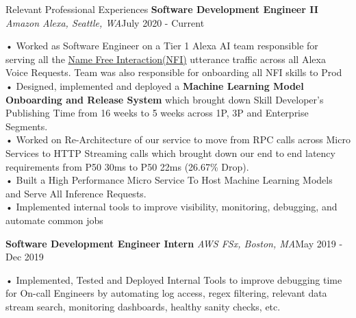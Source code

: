 \documentclass{resume} %
\begin{document}
\begin{rSection}{Relevant Professional Experiences}
\textbf{Software Development Engineer II } \textit{Amazon Alexa, Seattle, WA}\hfill July 2020 - Current \\
\vspace{-1.7em} \begin{addmargin}[0.5em]{0em}
• Worked as Software Engineer on a Tier 1 Alexa AI team responsible for serving all the \href{https://developer.amazon.com/en-US/docs/alexa/custom-skills/understand-name-free-interaction-for-custom-skills.html}{Name Free Interaction(NFI)} utterance traffic across all Alexa Voice Requests. Team was also responsible for onboarding all NFI skills to Prod\\
• Designed, implemented and deployed a \textbf{Machine Learning Model Onboarding and Release System} which brought down Skill Developer's Publishing Time from 16 weeks to 5 weeks across 1P, 3P and Enterprise Segments. \\
• Worked on Re-Architecture of our service to move from RPC calls across Micro Services to HTTP Streaming calls which brought down our end to end latency requirements from P50 30ms to P50 22ms (26.67\% Drop).\\
• Built a High Performance Micro Service To Host Machine Learning Models and Serve All Inference Requests. \\
• Implemented internal tools to improve visibility, monitoring, debugging, and automate common jobs \\
\end{addmargin} \vspace{-1.7em}
\textbf{Software Development Engineer Intern } \textit{AWS FSx, Boston, MA}\hfill May 2019 - Dec 2019 \\
\vspace{-1.7em} \begin{addmargin}[0.5em]{0em}
• Implemented, Tested and Deployed Internal Tools to improve debugging time for On-call Engineers by automating log access, regex filtering, relevant data stream search, monitoring dashboards, healthy sanity checks, etc. \\

\end{addmargin}
\end{rSection}
\end{document}
